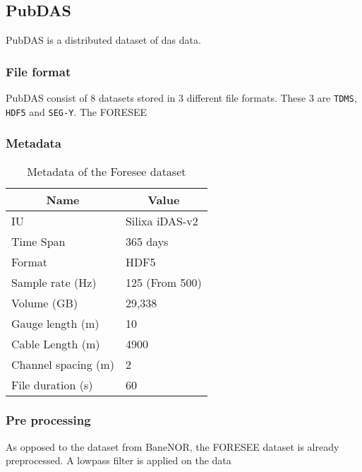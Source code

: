 \subsection{PubDAS}

PubDAS \cite{spica2023pubdas} is a distributed dataset of \acrfull{das} data. 



\subsubsection{File format}

PubDAS consist of 8 datasets stored in 3 different file formats. These 3 are \texttt{TDMS}, \texttt{HDF5} and \texttt{SEG-Y}. 
The FORESEE

\subsubsection{Metadata}

\begin{table}[h]
    \small
    \centering
    \begin{tabular}{|l|l|}
    \toprule
    \multicolumn{1}{|c|}{\textbf{Name}} & \multicolumn{1}{c|}{\textbf{Value}} \\ \hline
    IU                                  & Silixa iDAS-v2                      \\ \hline
    Time Span                           & 365 days                            \\ \hline
    Format                              & HDF5                                \\ \hline
    Sample rate (Hz)                    & 125 (From 500)                      \\ \hline
    Volume (GB)                         & 29,338                              \\ \hline
    Gauge length (m)                    & 10                                  \\ \hline
    Cable Length (m)                    & 4900                                \\ \hline
    Channel spacing (m)                 & 2                                   \\ \hline
    File duration (s)                   & 60                                  \\
    \bottomrule
    \end{tabular}
    \caption{Metadata of the Foresee dataset}
    \label{tab:foresee_meta}
\end{table}

\subsubsection{Pre processing}

As opposed to the dataset from BaneNOR, the FORESEE dataset is already preprocessed. A lowpass filter is applied on the data